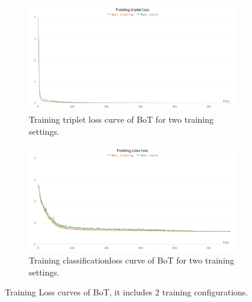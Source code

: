 
\begin{figure}[!h]
	\centering
	\begin{subfigure}[]{0.9\textwidth}
		\includegraphics[width=\textwidth]{figures/06_results/ApperanceTrainTriplet.png}
		\caption{\footnotesize{Training triplet loss curve of BoT for two training settings.}}
		\label{fig:appearanceClass}
	\end{subfigure}
	\begin{subfigure}[]{0.9\textwidth}
		\includegraphics[width=\textwidth]{figures/06_results/ApperanceTrainClass.png}
		\caption{\footnotesize{Training classificationloss curve of BoT for two training settings.}}
		\label{fig:appearanceTriplet}
	\end{subfigure}
	
	\caption[Training Loss curves of BoT]{\footnotesize{Training Loss curves of BoT, it includes 2 training configurations.}}
	\label{fig:training appearance}
	\vspace{-4em}
\end{figure}

